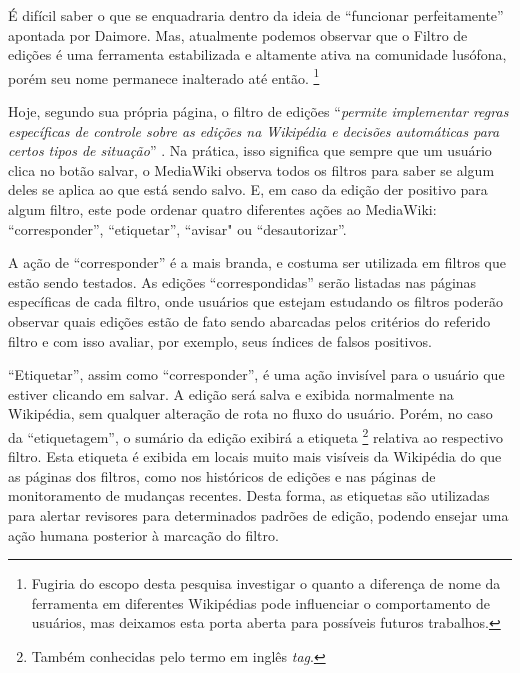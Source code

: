 É difícil saber o que se enquadraria dentro da ideia de ``funcionar perfeitamente'' apontada por Daimore. Mas, atualmente podemos observar que o Filtro de edições é uma ferramenta estabilizada e altamente ativa na comunidade lusófona, porém seu nome permanece inalterado até então. \footnote{Fugiria do escopo desta pesquisa investigar o quanto a diferença de nome da ferramenta em diferentes Wikipédias pode influenciar o comportamento de usuários, mas deixamos esta porta aberta para possíveis futuros trabalhos.}

Hoje, segundo sua própria página, o filtro de edições ``\textit{permite implementar regras específicas de controle sobre as edições na Wikipédia e decisões automáticas para certos tipos de situação}'' . Na prática, isso significa que sempre que um usuário clica no botão salvar, o MediaWiki observa todos os filtros para saber se algum deles se aplica ao que está sendo salvo. E, em caso da edição der positivo para algum filtro, este pode ordenar quatro diferentes ações ao MediaWiki: ``corresponder'', ``etiquetar'', ``avisar" ou ``desautorizar''.

A ação de ``corresponder'' é a mais branda, e costuma ser utilizada em filtros que estão sendo testados. As edições ``correspondidas'' serão listadas nas páginas específicas de cada filtro, onde usuários que estejam estudando os filtros poderão observar quais edições estão de fato sendo abarcadas pelos critérios do referido filtro e com isso avaliar, por exemplo, seus índices de falsos positivos.

``Etiquetar'', assim como ``corresponder'', é uma ação invisível para o usuário que estiver clicando em salvar. A edição será salva e exibida normalmente na Wikipédia, sem qualquer alteração de rota no fluxo do usuário. Porém, no caso da ``etiquetagem'', o sumário da edição exibirá a etiqueta \footnote{Também conhecidas pelo termo em inglês \textit{tag}.} relativa ao respectivo filtro. Esta etiqueta é exibida em locais muito mais visíveis da Wikipédia do que as páginas dos filtros, como nos históricos de edições e nas páginas de monitoramento de mudanças recentes. Desta forma, as etiquetas são utilizadas para alertar revisores para determinados padrões de edição, podendo ensejar uma ação humana posterior à marcação do filtro.

